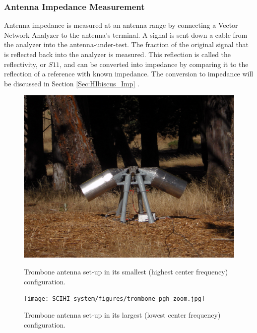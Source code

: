 \subsubsection{Antenna Impedance Measurement} 

Antenna impedance is measured at an antenna range by connecting a Vector Network Analyzer to the antenna's terminal. A signal is sent down a cable from the analyzer into the antenna-under-test. The fraction of the original signal that is reflected back into the analyzer is measured. This reflection is called the reflectivity, or $S11$, and can be converted into impedance by comparing it to the reflection of a reference with known impedance. The conversion to impedance will be discussed in Section \ref{Sec:HIbiscus_Imp} \cite{stutzman1981}.

\begin{figure}[htb]
\centering
\begin{minipage}[b]{0.46\textwidth}
\centering
\includegraphics[width=0.95\linewidth]{SCIHI_system/figures/trombone_guad_small.jpg}
\caption{Trombone antenna set-up in its smallest (highest center frequency) configuration. }
\label{Fig:trombone_small}
\end{minipage}%
\begin{minipage}[b]{0.02\textwidth}
\hspace{1cm}
\end{minipage}%
\begin{minipage}[b]{0.51\textwidth}
\centering
\texttt{[image: SCIHI\_system/figures/trombone\_pgh\_zoom.jpg]}
\caption{Trombone antenna set-up in its largest (lowest center frequency) configuration.}
\label{Fig:trombone_large}
\end{minipage}
\end{figure}


